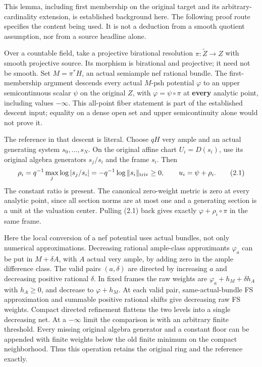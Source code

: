 \documentclass[
  10pt,
]{article}
\begin{document}
This lemma, including first membership on the original target and its
arbitrary-cardinality extension, is established background here. The
following proof route specifies the content being used. It is not a
deduction from a smooth quotient assumption, nor from a source headline
alone.

Over a countable field, take a projective birational resolution
\(\pi:\widetilde Z\to Z\) with smooth projective source. Its morphism is
birational and projective; it need not be smooth. Set \(M=\pi^*H\), an
actual semiample nef rational bundle. The first-membership argument
descends every actual \(M\)-psh potential \(\varphi\) to an upper
semicontinuous scalar \(\psi\) on the original \(Z\), with
\(\varphi=\psi\circ\pi\) at \textbf{every} analytic point, including
values \(-\infty\). This all-point fiber statement is part of the
established descent input; equality on a dense open set and upper
semicontinuity alone would not prove it.

The reference in that descent is literal. Choose \(qH\) very ample and
an actual generating system \(s_0,\ldots,s_N\). On the original affine
chart \(U_i=D(s_i)\), use its original algebra generators \(s_j/s_i\)
and the frame \(s_i\). Then \[
 \rho_i=q^{-1}\max_j\log|s_j/s_i|
        =-q^{-1}\log\|s_i\|_{\rm triv}\geq0,
 \qquad u_i=\psi+\rho_i.                                        \tag{2.1}
\] The constant ratio is present. The canonical zero-weight metric is
zero at every analytic point, since all section norms are at most one
and a generating section is a unit at the valuation center. Pulling
(2.1) back gives exactly \(\varphi+\rho_i\circ\pi\) in the same frame.

Here the local conversion of a nef potential uses actual bundles, not
only numerical approximations. Decreasing rational ample-class
approximants \(\varphi_a\) can be put in \(M+\delta A\), with \(A\)
actual very ample, by adding zero in the ample difference class. The
valid pairs \((a,\delta)\) are directed by increasing \(a\) and
decreasing positive rational \(\delta\). In fixed frames the raw weights
are \(\varphi_a+h_M+\delta h_A\) with \(h_A\geq0\), and decrease to
\(\varphi+h_M\). At each valid pair, same-actual-bundle FS approximation
and summable positive rational shifts give decreasing raw FS weights.
Compact directed refinement flattens the two levels into a single
decreasing net. At a \(-\infty\) limit the comparison is with an
arbitrary finite threshold. Every missing original algebra generator and
a constant floor can be appended with finite weights below the old
finite minimum on the compact neighborhood. Thus this operation retains
the original ring and the reference exactly.
\end{document}
